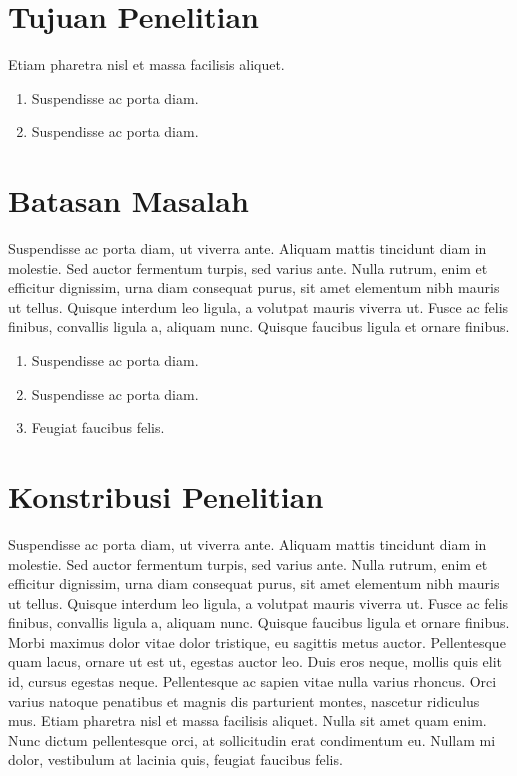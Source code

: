 \section{Tujuan Penelitian}
Etiam pharetra nisl et massa facilisis aliquet.
\begin{enumerate}[nolistsep,leftmargin=0.5cm]
  \item Suspendisse ac porta diam.
  \item Suspendisse ac porta diam.\\
\end{enumerate}

\section{Batasan Masalah}
Suspendisse ac porta diam, ut viverra ante. Aliquam mattis tincidunt diam in molestie. Sed auctor fermentum turpis, sed varius ante. Nulla rutrum, enim et efficitur dignissim, urna diam consequat purus, sit amet elementum nibh mauris ut tellus. Quisque interdum leo ligula, a volutpat mauris viverra ut. Fusce ac felis finibus, convallis ligula a, aliquam nunc. Quisque faucibus ligula et ornare finibus.
\begin{enumerate}[nolistsep,leftmargin=0.5cm]
  \item Suspendisse ac porta diam.
  \item Suspendisse ac porta diam.
  \item Feugiat faucibus felis.\\
\end{enumerate}

\section{Konstribusi Penelitian}
Suspendisse ac porta diam, ut viverra ante. Aliquam mattis tincidunt diam in molestie. Sed auctor fermentum turpis, sed varius ante. Nulla rutrum, enim et efficitur dignissim, urna diam consequat purus, sit amet elementum nibh mauris ut tellus. Quisque interdum leo ligula, a volutpat mauris viverra ut. Fusce ac felis finibus, convallis ligula a, aliquam nunc. Quisque faucibus ligula et ornare finibus. Morbi maximus dolor vitae dolor tristique, eu sagittis metus auctor. Pellentesque quam lacus, ornare ut est ut, egestas auctor leo. Duis eros neque, mollis quis elit id, cursus egestas neque. Pellentesque ac sapien vitae nulla varius rhoncus. Orci varius natoque penatibus et magnis dis parturient montes, nascetur ridiculus mus. Etiam pharetra nisl et massa facilisis aliquet. Nulla sit amet quam enim. Nunc dictum pellentesque orci, at sollicitudin erat condimentum eu. Nullam mi dolor, vestibulum at lacinia quis, feugiat faucibus felis.\\

